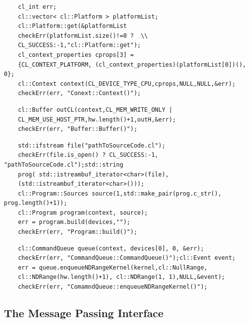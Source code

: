     
    \begin{lstlisting}
    cl_int err;
    cl::vector< cl::Platform > platformList;
    cl::Platform::get(&platformList
    checkErr(platformList.size()!=0 ?  \\
    CL_SUCCESS:-1,"cl::Platform::get");
    cl_context_properties cprops[3] =
    {CL_CONTEXT_PLATFORM, (cl_context_properties)(platformList[0])(), 0};
    cl::Context context(CL_DEVICE_TYPE_CPU,cprops,NULL,NULL,&err);
    checkErr(err, "Conext::Context()"); 
    \end{lstlisting}
    
    \begin{lstlisting}
    cl::Buffer outCL(context,CL_MEM_WRITE_ONLY |
    CL_MEM_USE_HOST_PTR,hw.length()+1,outH,&err);
    checkErr(err, "Buffer::Buffer()");
    \end{lstlisting}
    
    \begin{lstlisting}
    std::ifstream file("pathToSourceCode.cl");
    checkErr(file.is_open() ? CL_SUCCESS:-1, "pathToSourceCode.cl");std::string
    prog( std::istreambuf_iterator<char>(file),
    (std::istreambuf_iterator<char>()));
    cl::Program::Sources source(1,std::make_pair(prog.c_str(), prog.length()+1));
    cl::Program program(context, source);
    err = program.build(devices,"");
    checkErr(err, "Program::build()");
    \end{lstlisting}
    
    \begin{lstlisting}
    cl::CommandQueue queue(context, devices[0], 0, &err);
    checkErr(err, "CommandQueue::CommandQueue()");cl::Event event;
    err = queue.enqueueNDRangeKernel(kernel,cl::NullRange,
    cl::NDRange(hw.length()+1),	cl::NDRange(1, 1),NULL,&event);
    checkErr(err, "ComamndQueue::enqueueNDRangeKernel()");
    \end{lstlisting}
\subsection{The Message Passing Interface}


    